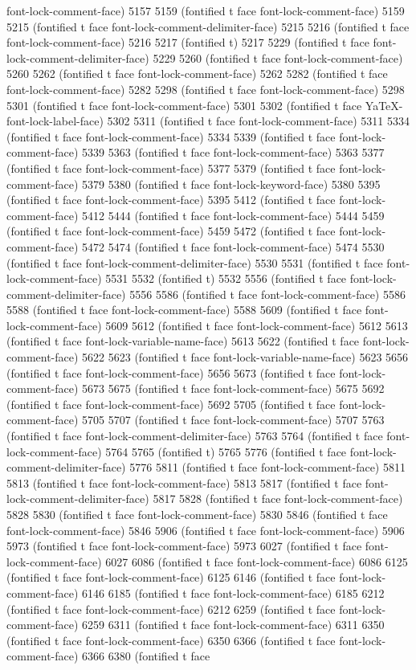 {{font-lock-comment-face) 5157 5159 (fontified t face font-lock-comment-face) 5159 5215 (fontified t face font-lock-comment-delimiter-face) 5215 5216 (fontified t face font-lock-comment-face) 5216 5217 (fontified t) 5217 5229 (fontified t face font-lock-comment-delimiter-face) 5229 5260 (fontified t face font-lock-comment-face) 5260 5262 (fontified t face font-lock-comment-face) 5262 5282 (fontified t face font-lock-comment-face) 5282 5298 (fontified t face font-lock-comment-face) 5298 5301 (fontified t face font-lock-comment-face) 5301 5302 (fontified t face YaTeX-font-lock-label-face) 5302 5311 (fontified t face font-lock-comment-face) 5311 5334 (fontified t face font-lock-comment-face) 5334 5339 (fontified t face font-lock-comment-face) 5339 5363 (fontified t face font-lock-comment-face) 5363 5377 (fontified t face font-lock-comment-face) 5377 5379 (fontified t face font-lock-comment-face) 5379 5380 (fontified t face font-lock-keyword-face) 5380 5395 (fontified t face font-lock-comment-face) 5395 5412 (fontified t face font-lock-comment-face) 5412 5444 (fontified t face font-lock-comment-face) 5444 5459 (fontified t face font-lock-comment-face) 5459 5472 (fontified t face font-lock-comment-face) 5472 5474 (fontified t face font-lock-comment-face) 5474 5530 (fontified t face font-lock-comment-delimiter-face) 5530 5531 (fontified t face font-lock-comment-face) 5531 5532 (fontified t) 5532 5556 (fontified t face font-lock-comment-delimiter-face) 5556 5586 (fontified t face font-lock-comment-face) 5586 5588 (fontified t face font-lock-comment-face) 5588 5609 (fontified t face font-lock-comment-face) 5609 5612 (fontified t face font-lock-comment-face) 5612 5613 (fontified t face font-lock-variable-name-face) 5613 5622 (fontified t face font-lock-comment-face) 5622 5623 (fontified t face font-lock-variable-name-face) 5623 5656 (fontified t face font-lock-comment-face) 5656 5673 (fontified t face font-lock-comment-face) 5673 5675 (fontified t face font-lock-comment-face) 5675 5692 (fontified t face font-lock-comment-face) 5692 5705 (fontified t face font-lock-comment-face) 5705 5707 (fontified t face font-lock-comment-face) 5707 5763 (fontified t face font-lock-comment-delimiter-face) 5763 5764 (fontified t face font-lock-comment-face) 5764 5765 (fontified t) 5765 5776 (fontified t face font-lock-comment-delimiter-face) 5776 5811 (fontified t face font-lock-comment-face) 5811 5813 (fontified t face font-lock-comment-face) 5813 5817 (fontified t face font-lock-comment-delimiter-face) 5817 5828 (fontified t face font-lock-comment-face) 5828 5830 (fontified t face font-lock-comment-face) 5830 5846 (fontified t face font-lock-comment-face) 5846 5906 (fontified t face font-lock-comment-face) 5906 5973 (fontified t face font-lock-comment-face) 5973 6027 (fontified t face font-lock-comment-face) 6027 6086 (fontified t face font-lock-comment-face) 6086 6125 (fontified t face font-lock-comment-face) 6125 6146 (fontified t face font-lock-comment-face) 6146 6185 (fontified t face font-lock-comment-face) 6185 6212 (fontified t face font-lock-comment-face) 6212 6259 (fontified t face font-lock-comment-face) 6259 6311 (fontified t face font-lock-comment-face) 6311 6350 (fontified t face font-lock-comment-face) 6350 6366 (fontified t face font-lock-comment-face) 6366 6380 (fontified t face }}
